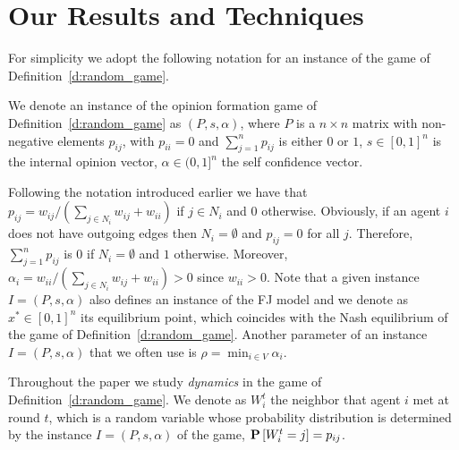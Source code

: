 \section{Our Results and Techniques}\label{s:results}

For simplicity we adopt the following notation for
an instance of the game of Definition~\ref{d:random_game}.
%
\begin{definition}\label{d:instance}
  We denote an instance of the opinion formation game of Definition~\ref{d:random_game}
  as $(P,s,\alpha)$, where
    $P$ is a $n \times n$  matrix with non-negative elements $p_{ij}$,
      with $p_{ii}=0$ and $\sum_{j=1}^n p_{ij}$ is either $0$ or $1$,
    $s \in [0,1]^n$ is the internal opinion vector,
    $\alpha \in (0,1]^n$ the self confidence vector.
\end{definition}
%
Following the notation introduced earlier we have that
$p_{ij} = w_{ij}/(\sum_{j \in N_i}w_{ij}+w_{ii})$ if $j \in N_i$ and $0$ otherwise.
Obviously, if an agent $i$ does not have outgoing edges then $N_i = \emptyset$ and
$p_{ij} = 0$ for all $j$. Therefore, $\sum_{j=1}^n p_{ij}$ is $0$ if $N_i= \emptyset$
and $1$ otherwise.
Moreover, $\alpha_i=w_{ii}/(\sum_{j \in N_i}w_{ij}+w_{ii})>0$ since $w_{ii}>0$.
Note that a given instance $I=(P,s,\alpha)$ also defines an instance
of the FJ model and we denote as $x^* \in [0,1]^n$
its equilibrium point, which coincides with the Nash equilibrium
of the game of Definition~\ref{d:random_game}.
Another parameter of an instance $I=(P,s,\alpha)$ that we often use is
$\rho=\min_{i \in V}\alpha_i$.



Throughout the paper we study \emph{dynamics}
in the game of Definition~\ref{d:random_game}.
We denote as $W_i^t$ the neighbor that agent $i$ met
at round $t$, which is a random variable whose
probability distribution is determined by the
instance $I=(P,s,\alpha)$ of the game, $\bm{\mathrm{P}}\left[W_i^t=j\right]=p_{ij}$.



